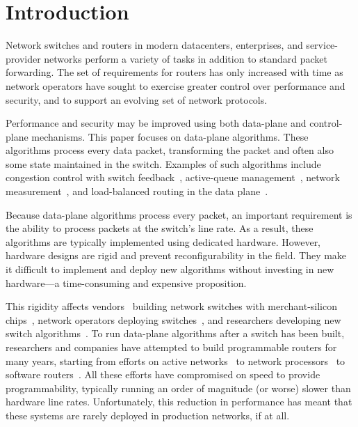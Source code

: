 \section{Introduction}
\label{s:intro}

Network switches and routers in modern datacenters, enterprises, and
service-provider networks perform a variety of tasks in addition to standard
packet forwarding. The set of requirements for routers has only increased with
time as network operators have sought to exercise greater control over
performance and security, and to support an evolving set of network protocols.

Performance and security may be improved using both data-plane and
control-plane mechanisms. This paper focuses on data-plane algorithms. These
algorithms process every data packet, transforming the packet and often also
some state maintained in the switch.  Examples of such algorithms include
congestion control with switch feedback~\cite{xcp, rcp, pdq, dctcp},
active-queue management~\cite{red,blue,avq,codel,pie}, network
measurement~\cite{opensketch, bitmap_george, elephant_george}, and
load-balanced routing in the data plane~\cite{conga}.

Because data-plane algorithms process every packet, an important requirement is
the ability to process packets at the switch's line rate.  As a result, these
algorithms are typically implemented using dedicated hardware. However,
hardware designs are rigid and prevent reconfigurability in the field. They
make it difficult to implement and deploy new algorithms without investing in
new hardware---a time-consuming and expensive proposition.

This rigidity affects vendors~\cite{cisco_nexus, dell_force10, arista_7050}
building network switches with merchant-silicon chips~\cite{trident, tomahawk,
mellanox}, network operators deploying switches~\cite{google,facebook,vl2}, and
researchers developing new switch algorithms~\cite{xcp, codel, d3, detail,
pdq}.  To run data-plane algorithms after a switch has been built, researchers
and companies have attempted to build programmable routers for many years,
starting from efforts on active networks~\cite{active-nets} to network
processors~\cite{npu_survey} to software routers~\cite{click,routebricks,
fastpass, flexplane}. All these efforts have compromised on speed to provide
programmability, typically running an order of magnitude (or worse) slower than
hardware line rates.  Unfortunately, this reduction in performance has meant
that these systems are rarely deployed in production networks, if at all.

